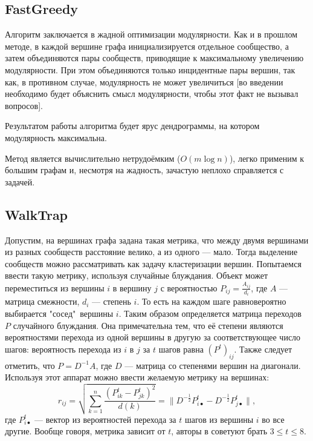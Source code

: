 \documentclass[12pt]{article}
\begin{document}
\subsection{FastGreedy}

Алгоритм \cite{fast_greedy} заключается в жадной оптимизации модулярности. Как и в прошлом методе, в каждой вершине графа инициализируется отдельное сообщество, а затем объединяются пары сообществ, приводящие к максимальному увеличению модулярности. При этом объединяются только инцидентные пары вершин, так как, в противном случае, модулярность не может увеличиться [во введении необходимо будет объяснить смысл модулярности, чтобы этот факт не вызывал вопросов]. 

Результатом работы алгоритма будет ярус дендрограммы, на котором модулярность максимальна.

Метод является вычислительно нетрудоёмким ($O(m\log n)$), легко применим к большим графам и, несмотря на жадность, зачастую неплохо справляется с задачей.

\subsection{WalkTrap}

Допустим, на вершинах графа задана такая метрика, что между двумя вершинами из разных сообществ расстояние велико, а из одного --- мало. Тогда выделение сообществ можно рассматривать как задачу кластеризации вершин. Попытаемся ввести такую метрику, используя случайные блуждания. Объект может переместиться из вершины $i$ в вершину $j$ с вероятностью $P_{ij} = \frac{A_{ij}}{d_i}$, где $A$ --- матрица смежности, $d_i$ --- степень $i$. То есть на каждом шаге равновероятно выбирается "сосед"\ вершины $i$. Таким образом определяется матрица переходов $P$ случайного блуждания. Она примечательна тем, что её степени являются вероятностями перехода из одной вершины в другую за соответствующее число шагов: вероятность перехода из $i$ в $j$ за $t$ шагов равна $(P^t)_{ij}$. Также следует отметить, что $P = D^{-1}A$, где $D$ --- матрица со степенями вершин на диагонали. Используя этот аппарат можно ввести желаемую метрику на вершинах: 
\[
r_{ij} = \sqrt{\sum\limits_{k=1}^{n}\frac{(P_{ik}^t - P_{jk}^t)^2}{d(k)}} = \bigl\|D^{-\frac{1}{2}}P^t_{i\bullet} - D^{-\frac{1}{2}}P^t_{j\bullet}\bigr\|,
\]
где $P^t_{i\bullet}$ --- вектор из вероятностей перехода за $t$ шагов из вершины $i$ во все другие. Вообще говоря, метрика зависит от $t$, авторы в \cite{walktrap} советуют брать $3 \leq t \leq 8$.
\end{document}
